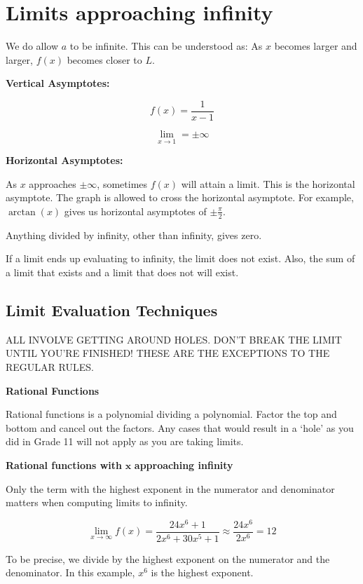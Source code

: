 \documentclass[12pt]{article}
\theoremstyle{plain}
\theoremstyle{remark}
\theoremstyle{definition}
\begin{document}
\section{Limits approaching
infinity}

We do allow \(a\) to be infinite. This can be understood as: As \(x\)
becomes larger and larger, \(f(x)\) becomes closer to \(L\).

\textbf{Vertical Asymptotes:}

\[f(x) = \frac{1}{x - 1}\]

\[\lim_{x \rightarrow 1}{= \pm \infty}\]

\textbf{Horizontal Asymptotes:}

As \(x\) approaches \(\pm \infty\), sometimes \(f(x)\) will attain a
limit. This is the horizontal asymptote. The graph is allowed to cross
the horizontal asymptote. For example, \(\arctan(x)\) gives us
horizontal asymptotes of \(\pm \frac{\pi}{2}\).

Anything divided by infinity, other than infinity, gives zero.

If a limit ends up evaluating to infinity, the limit does not exist.
Also, the sum of a limit that exists and a limit that does not will
exist.


\subsection{Limit Evaluation
Techniques}

ALL INVOLVE GETTING AROUND HOLES. DON'T BREAK THE LIMIT UNTIL YOU'RE
FINISHED! THESE ARE THE EXCEPTIONS TO THE REGULAR RULES.

\textbf{Rational Functions}

Rational functions is a polynomial dividing a polynomial. Factor the top
and bottom and cancel out the factors. Any cases that would result in a
`hole' as you did in Grade 11 will not apply as you are taking limits.

\textbf{Rational functions with} \(\mathbf{x}\) \textbf{approaching
infinity}

Only the term with the highest exponent in the numerator and denominator
matters when computing limits to infinity.

\[\lim_{x \rightarrow \infty}{f(x) = \frac{24x^{6} + 1}{2x^{6} + 30x^{5} + 1} \approx \frac{24x^{6}}{2x^{6}} = 12}\]

To be precise, we divide by the highest exponent on the numerator and
the denominator. In this example, \(x^{6}\) is the highest exponent.
\end{document}
